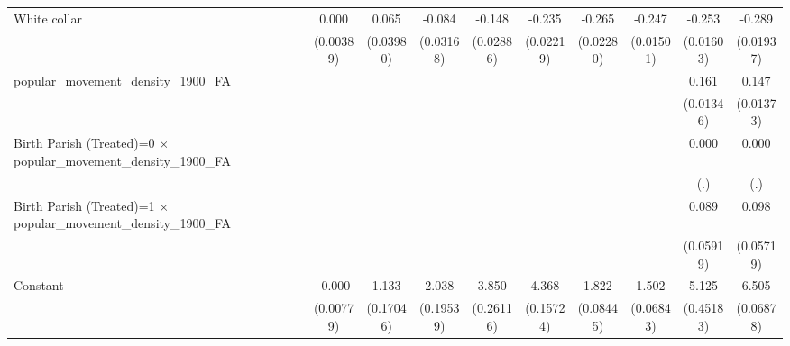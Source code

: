 {\begin{tabular}{l*{9}{c}}
White collar        &       0.000         &       0.065         &      -0.084\sym{**} &      -0.148\sym{***}&      -0.235\sym{***}&      -0.265\sym{***}&      -0.247\sym{***}&      -0.253\sym{***}&      -0.289\sym{***}\\
                    &   (0.00389)         &   (0.03980)         &   (0.03168)         &   (0.02886)         &   (0.02219)         &   (0.02280)         &   (0.01501)         &   (0.01603)         &   (0.01937)         \\
popular\_movement\_density\_1900\_FA&                     &                     &                     &                     &                     &                     &                     &       0.161\sym{***}&       0.147\sym{***}\\
                    &                     &                     &                     &                     &                     &                     &                     &   (0.01346)         &   (0.01373)         \\
Birth Parish (Treated)=0 $\times$ popular\_movement\_density\_1900\_FA&                     &                     &                     &                     &                     &                     &                     &       0.000         &       0.000         \\
                    &                     &                     &                     &                     &                     &                     &                     &         (.)         &         (.)         \\
Birth Parish (Treated)=1 $\times$ popular\_movement\_density\_1900\_FA&                     &                     &                     &                     &                     &                     &                     &       0.089         &       0.098         \\
                    &                     &                     &                     &                     &                     &                     &                     &   (0.05919)         &   (0.05719)         \\
Constant            &      -0.000         &       1.133\sym{***}&       2.038\sym{***}&       3.850\sym{***}&       4.368\sym{***}&       1.822\sym{***}&       1.502\sym{***}&       5.125\sym{***}&       6.505\sym{***}\\
                    &   (0.00779)         &   (0.17046)         &   (0.19539)         &   (0.26116)         &   (0.15724)         &   (0.08445)         &   (0.06843)         &   (0.45183)         &   (0.06878)         \\

\end{tabular}}
